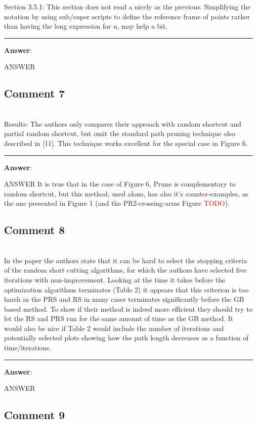\documentclass{scrartcl}
\newcommand{\todo}{\textcolor{red}{TODO}}
\begin{document}
Section 3.5.1:
This section does not read a nicely as the previous. Simplifying the notation by using sub/super scripts to define the reference frame of points rather than having the long expression for u, may help a bit.

\rule{\linewidth}{.1pt}
\textbf{Answer}:

ANSWER

\subsection{Comment 7}
\hrulefill\\

Results:
The authors only compares their approach with random shortcut and partial random shortcut, but omit the standard path pruning technique also described in [11]. This technique works excellent for the special case in Figure 6. 

\rule{\linewidth}{.1pt}
\textbf{Answer}:

ANSWER
It is true that in the case of Figure 6, Prune is complementary to random shortcut, but this method, used alone, has also it's counter-examples, as the one presented in Figure 1 (and the PR2-crossing-arms Figure \todo).

\subsection{Comment 8}
\hrulefill\\

In the paper the authors state that it can be hard to select the stopping criteria of the random short cutting algorithms, for which the authors have selected five iterations with non-improvement. Looking at the time it takes before the optimization algorithms terminates (Table 2) it appears that this criterion is too harsh as the PRS and RS in many cases terminates significantly before the GB based method. To show if their method is indeed more efficient they should try to let the RS and PRS run for the same amount of time as the GB method. It would also be nice if Table 2 would include the number of iterations and potentially selected plots showing how the path length decreases as a function of time/iterations.

\rule{\linewidth}{.1pt}
\textbf{Answer}:

ANSWER

\subsection{Comment 9}
\hrulefill\\
\end{document}
